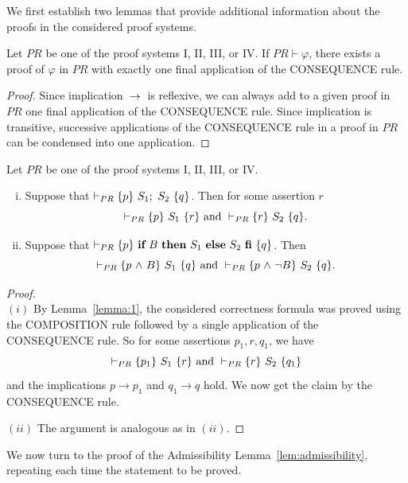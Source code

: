 \documentclass[runningheads]{llncs}       %
\begin{document}

We first establish two lemmas that provide additional
information about the proofs in the considered proof systems.

\begin{lemma} \label{lemma:1}
Let $\mathit{PR}$ be one of the proof systems I, II, III, or IV.
If $\mathit{PR} \vdash \varphi$, there exists a proof of $\varphi$ in $\mathit{PR}$ 
with exactly one final application of the CONSEQUENCE rule.
\end{lemma}

\begin{proof}
Since implication $\mbox{$\:\rightarrow\:$}$ is reflexive, we can always add to a given proof in $\mathit{PR}$
one final application of the CONSEQUENCE rule.
Since implication is transitive, successive applications of the CONSEQUENCE rule in a proof in $\mathit{PR}$
can be condensed into one application.
\HB
\end{proof} 

\begin{lemma} \label{lem:useful}
Let $\mathit{PR}$ be one of the proof systems I, II, III, or IV.
  \begin{enumerate} [(i)] 
  \item  Suppose that  $\vdash_{PR} \HT{p}{S_1; \ S_2}{q}$.
    Then for some assertion $r$
    \[
 \vdash_{PR} \mbox{$\{{p}\}\ {S_1}\ \{{r}\}$} \mbox{ and }
 \vdash_{PR} \mbox{$\{{r}\}\ {S_2}\ \{{q}\}$}.
\]

\item Suppose that  $\vdash_{PR} \mbox{$\{{p}\}\ {\mbox{$\mbox{{\bf if}\ } {B} \mbox{\ {\bf then}\ } {S_1} \mbox{\ {\bf else}\ } {S_2}\ \mbox{{\bf fi}}$}}\ \{{q}\}$}$.
    Then 
    \[
 \vdash_{PR} \mbox{$\{{p \mbox{$\ \wedge\ $} B}\}\ {S_1}\ \{{q}\}$} \mbox{ and }
 \vdash_{PR} \mbox{$\{{p \mbox{$\ \wedge\ $} \neg B}\}\ {S_2}\ \{{q}\}$}.
\]
 \end{enumerate}    
\end{lemma}
\begin{proof}
  \mbox{} \\
  $(i)$ By Lemma~\ref{lemma:1}, the considered correctness formula was proved using
  the COMPOSITION rule followed by a single application of the CONSEQUENCE rule.
  So for some assertions $p_1, r, q_1$, we have
    \[
 \vdash_{PR} \mbox{$\{{p_1}\}\ {S_1}\ \{{r}\}$} \mbox{ and }
 \vdash_{PR} \mbox{$\{{r}\}\ {S_2}\ \{{q_1}\}$}
\]
and the implications $p \to p_1$ and $q_1 \to q$ hold.
We now get the claim by the CONSEQUENCE rule.
\III

\NI
$(ii)$ The argument is analogous as in $(ii)$. 
\HB
\end{proof}

We now turn to the proof of the Admissibility Lemma~\ref{lem:admissibility}, 
repeating each time the statement to be proved.
\end{document}
